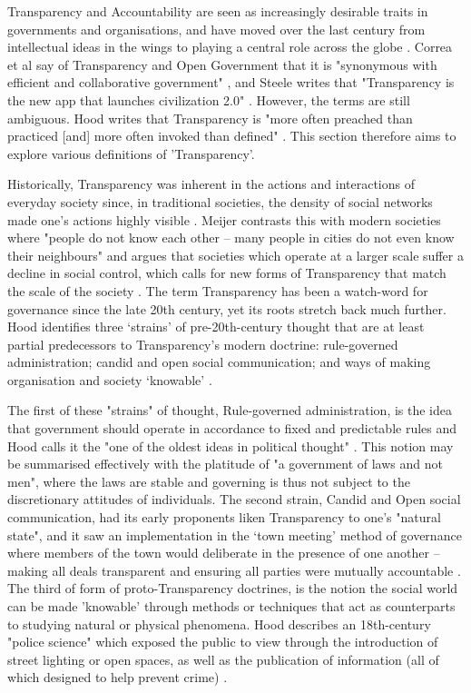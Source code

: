 Transparency and Accountability are seen as increasingly desirable traits in governments and organisations, and have moved over the last century from intellectual ideas in the wings to playing a central role across the globe \cite{oliver_what_2004}. Correa et al say of Transparency and Open Government that it is "synonymous with efficient and collaborative government" \cite{correa_really_2014}, and Steele writes that "Transparency is the new app that launches civilization 2.0" \cite{steele_open-source_2012}. However, the terms are still ambiguous. Hood writes that Transparency is "more often preached than practiced [and] more often invoked than defined" \cite{hood_transparency_2006}. This section therefore aims to explore various definitions of 'Transparency'.

Historically, Transparency was inherent in the actions and interactions of everyday society since, in traditional societies, the density of social networks made one's actions highly visible \cite{meijer_understanding_2009}. Meijer contrasts this with modern societies where "people do not know each other -- many people in cities do not even know their neighbours" and argues that societies which operate at a larger scale suffer a decline in social control, which calls for new forms of Transparency that match the scale of the society \cite{meijer_understanding_2009}. The term Transparency has been a watch-word for governance since the late 20th century, yet its roots stretch back much further. Hood identifies three `strains' of pre-20th-century thought that are at least partial predecessors to Transparency's modern doctrine: rule-governed administration; candid and open social communication; and ways of making organisation and society `knowable' \cite{hood_transparency_2006}.

The first of these "strains" of thought, Rule-governed administration, is the idea that government should operate in accordance to fixed and predictable rules and Hood calls it the "one of the oldest ideas in political thought" \cite{hood_transparency_2006}. This notion may be summarised effectively with the platitude of "a government of laws and not men", where the laws are stable and governing is thus not subject to the discretionary attitudes of individuals. The second strain, Candid and Open social communication, had its early proponents liken Transparency to one's "natural state", and it saw an implementation in the `town meeting' method of governance where members of the town would deliberate in the presence of one another -- making all deals transparent and ensuring all parties were mutually accountable \cite{hood_transparency_2006}. The third of form of proto-Transparency doctrines, is the notion the social world can be made 'knowable' through methods or techniques that act as counterparts to studying natural or physical phenomena. Hood describes an 18th-century "police science" which exposed the public to view through the introduction of street lighting or open spaces, as well as the publication of information (all of which designed to help prevent crime) \cite{hood_transparency_2006}.

